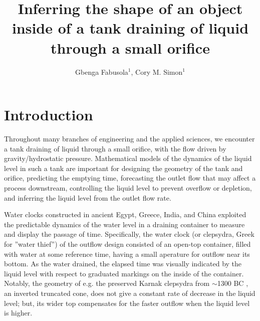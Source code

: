 \documentclass[openacc]{rsproca_new}%
\begin{document}
\title{Inferring the shape of an object inside of a tank draining of liquid through a small orifice}

\author{%
Gbenga Fabusola$^{1}$, 
Cory M. Simon$^{1}$
}

\address{$^{1}$School of Chemical, Biological, and Environmental Engineering. Oregon State University. Corvallis, OR, USA.
}

\subject{applied mathematics, chemical engineering}



\begin{abstract}

\absbreak %
\end{abstract}

\rsbreak


\section{Introduction}
Throughout many branches of engineering and the applied sciences, we encounter a tank draining of liquid through a small orifice, with the flow driven by gravity/hydrostatic pressure.
Mathematical models of the dynamics of the liquid level in such a tank are important for designing the geometry of the tank and orifice, predicting the emptying time, forecasting the outlet flow that may affect a process downstream, controlling the liquid level to prevent overflow or depletion, and inferring the liquid level from the outlet flow rate.

Water clocks constructed in ancient Egypt, Greece, India, and China exploited the predictable dynamics of the water level in a draining container to measure and display the passage of time. 
Specifically, the water clock (or clepsydra, Greek for ''water thief'') of the outflow design consisted of an open-top container, filled with water at some reference time, having a small aperature for outflow near its bottom. As the water drained, the elapsed time was visually indicated by the liquid level with respect to graduated markings on the inside of the container. \cite{bedini1962compartmented,hwang2021historical,ritner2016oriental,hejun1987research,schomberg2018karnak,mills1982newton}
Notably, the geometry of e.g. the preserved Karnak clepsydra from $\sim$1300 BC \cite{schomberg2018karnak}, an inverted truncated cone, does not give a constant rate of decrease in the liquid level; but, its wider top compensates for the faster outflow when the liquid level is higher.
\end{document}
